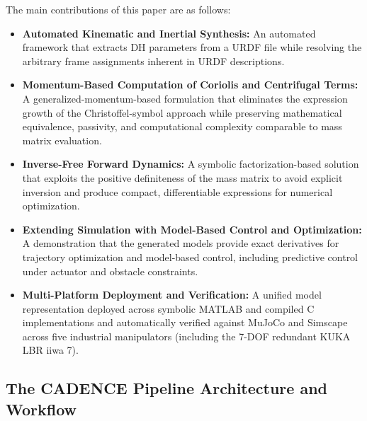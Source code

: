 \documentclass[fleqn,10pt]{article}
\begin{document}
The main contributions of this paper are as follows:
\begin{itemize}
	\item \textbf{Automated Kinematic and Inertial Synthesis:} An automated framework that extracts DH parameters from a URDF file while resolving the arbitrary frame assignments inherent in URDF descriptions.
	\item \textbf{Momentum-Based Computation of Coriolis and Centrifugal Terms:} A generalized-momentum-based formulation that eliminates the expression growth of the Christoffel-symbol approach while preserving mathematical equivalence, passivity, and computational complexity comparable to mass matrix evaluation.
	\item \textbf{Inverse-Free Forward Dynamics:} A symbolic factorization-based solution that exploits the positive definiteness of the mass matrix to avoid explicit inversion and produce compact, differentiable expressions for numerical optimization.
	\item \textbf{Extending Simulation with Model-Based Control and Optimization:} A demonstration that the generated models provide exact derivatives for trajectory optimization and model-based control, including predictive control under actuator and obstacle constraints.
	\item \textbf{Multi-Platform Deployment and Verification:} A unified model representation deployed across symbolic MATLAB and compiled C implementations and automatically verified against MuJoCo and Simscape across five industrial manipulators (including the 7-DOF redundant KUKA LBR iiwa 7).
\end{itemize}

\subsection{The CADENCE Pipeline Architecture and Workflow} \label{subsec:cadence_architecture}
\end{document}
